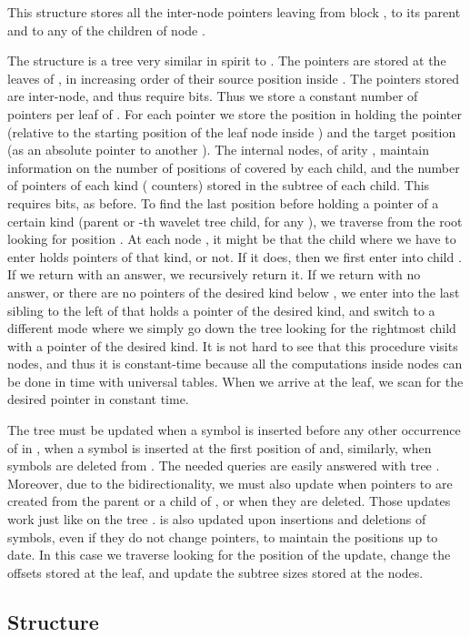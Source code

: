 \documentclass[11pt]{article}
\begin{document}
This structure stores all the inter-node pointers leaving from 
block , to its parent and to any of the  children of node .

The structure is a tree  very similar in spirit to . The pointers
are stored at the leaves of , in increasing order of their source
position inside .
The pointers stored are inter-node, and
thus require  bits. Thus we store a constant number of pointers 
per leaf of . For each pointer we store the position in  holding the pointer
(relative to the starting position of the leaf node inside ) 
and the target position (as an absolute pointer to another ). 
The internal nodes, of arity , maintain 
information on the number of positions of  covered by each child,
and the number of pointers of each kind ( counters) stored in the 
subtree of each child. This requires  bits, as
before. To find the last position before  holding a pointer of a certain
kind (parent or -th wavelet tree child, for any ), we 
traverse  from the root looking for position . At each node , it 
might be that the child  where we have to enter holds pointers of that kind,
or not. If it does, then we first enter into child . If we return with an 
answer, we recursively return it. If we return with no answer, or there are
no pointers of the desired kind below , we enter into the last sibling to 
the left of  that holds a pointer of the desired kind, and switch to a 
different mode where we simply go down the tree looking for the rightmost 
child with a pointer of the desired kind. It is not hard to see that this 
procedure visits  nodes, and thus it is constant-time because all 
the computations inside nodes can be done in  time with universal tables.
When we arrive at the leaf, 
we scan for the desired pointer in constant time.

The tree  must be updated when a symbol  is inserted before any other 
occurrence of  in , when a symbol is inserted at the first position 
of  and, similarly, when symbols are deleted from . The needed
queries are easily answered with tree . Moreover, due to the 
bidirectionality, we must also update  when pointers to  are 
created from the parent or a child of , or when they are deleted. 
Those updates work just like on the tree
.  is also updated upon insertions and deletions of symbols, even 
if they do not change pointers, to maintain the positions up to date. In this
case we traverse  looking for the position of the update, change the 
offsets stored at the leaf, and update the subtree sizes stored at the nodes. 

\subsection{Structure } 
\end{document}
